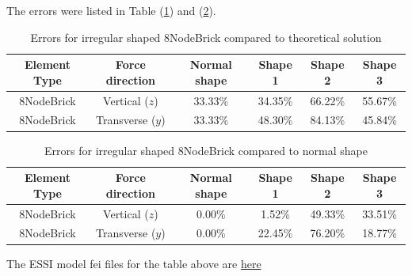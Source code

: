 \documentclass[fleqn,11pt,letter]{article}
\begin{document}
The errors were listed in Table (\ref{table Errors for irregular shaped 8NodeBrick compared to theoretical solution}) and (\ref{talbe Errors for irregular shaped 8NodeBrick compared to normal shape}).


\begin{table}[H]
  \centering
  \caption{Errors for irregular shaped 8NodeBrick compared to theoretical solution}
  \label{table Errors for irregular shaped 8NodeBrick compared to theoretical solution}
  \begin{tabular}{|c|c|c|c|c|c|}
    \hline 
    Element Type   & Force direction & Normal shape & Shape 1 & Shape 2 & Shape 3  \\ \hline 
    8NodeBrick     & Vertical ($z$)     & 33.33\%  & 34.35\% & 66.22\% & 55.67\%  \\ \hline
    8NodeBrick     & Transverse ($y$)      & 33.33\%  & 48.30\% & 84.13\% & 45.84\%  \\ \hline
  \end{tabular}
\end{table}

\begin{table}[H]
  \centering
  \caption{Errors for irregular shaped 8NodeBrick compared to normal shape}
  \label{talbe Errors for irregular shaped 8NodeBrick compared to normal shape}
  \begin{tabular}{|c|c|c|c|c|c|}
    \hline 
    Element Type   & Force direction & Normal shape & Shape 1 & Shape 2 & Shape 3  \\ \hline 
    8NodeBrick     & Vertical ($z$)     & 0.00\% & 1.52\%  & 49.33\% & 33.51\%       \\ \hline
    8NodeBrick     & Transverse ($y$)      & 0.00\% & 22.45\% & 76.20\% & 18.77\%       \\ \hline
  \end{tabular}
\end{table}

The ESSI model fei files for the table above are \href{https://github.com/yuan-energy/ESSI_Verification/blob/master/8NodeBrick/cantilever_irregular_element/cantilever_irregular_element.tar.gz?raw=true}{here}



\end{document}
